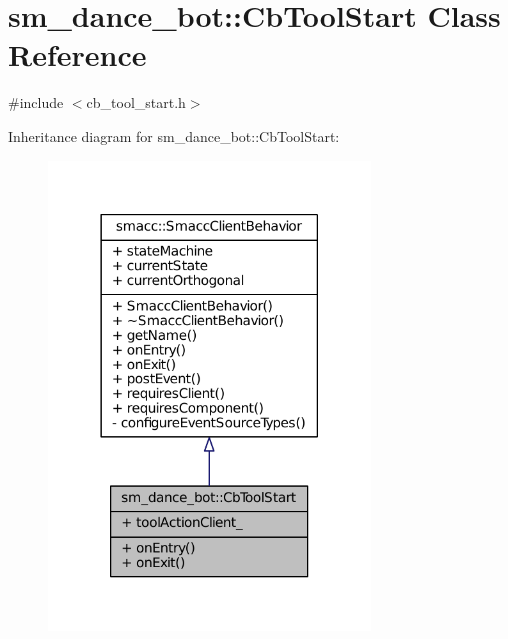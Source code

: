 \hypertarget{classsm__dance__bot_1_1CbToolStart}{}\section{sm\+\_\+dance\+\_\+bot\+:\+:Cb\+Tool\+Start Class Reference}
\label{classsm__dance__bot_1_1CbToolStart}


{\ttfamily \#include $<$cb\+\_\+tool\+\_\+start.\+h$>$}



Inheritance diagram for sm\+\_\+dance\+\_\+bot\+:\+:Cb\+Tool\+Start\+:
\nopagebreak
\begin{figure}[H]
\begin{center}
\leavevmode
\includegraphics[width=242pt]{classsm__dance__bot_1_1CbToolStart__inherit__graph}
\end{center}
\end{figure}


